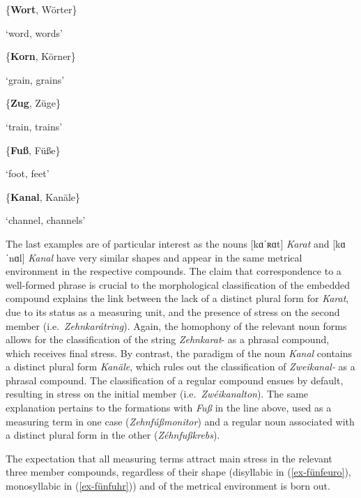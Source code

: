 \documentclass[output=paper
 ,nobabel
 ,draftmode
 ,colorlinks, citecolor=brown
]{langscibook}
\begin{document}
\ex \{\textbf{Wort}, Wörter\} 

`word, words' 

\ex \{\textbf{Korn}, Körner\} 

`grain, grains' 

\ex \{\textbf{Zug}, Züge\} 

`train, trains'	

\ex \{\textbf{Fuß}, Füße\} 

`foot, feet' 

\ex \{\textbf{Kanal}, Kanäle\} 

`channel, channels' 
\z
\z

\noindent
The last examples are of particular interest as the nouns [kɑˈʀɑt] \emph{Karat} and [kɑˈnɑl]
\emph{Kanal} have very similar shapes and appear in the same metrical environment in the respective
compounds. The claim that correspondence to a well-formed phrase is crucial to the morphological
classification of the embedded compound explains the link between the lack of a distinct plural form
for \emph{Karat}, due to its status as a measuring unit, and the presence of stress on the second
member (i.e.\ \emph{Zehnkarátring}). Again, the homophony of the relevant noun forms allows for the
classification of the string \emph{Zehnkarat}{}- as a phrasal compound, which receives final stress. By contrast, the paradigm of the noun \emph{Kanal} contains a distinct plural form \emph{Kanäle}, which rules out the classification of \emph{Zweikanal-} as a phrasal compound. The classification of a regular compound ensues by default, resulting in stress on the initial member (i.e.\ \emph{Zwéikanalton}).
The same explanation pertains to the formations with \emph{Fuß} in the line above, used as a measuring term in one case (\emph{Zehnfúßmonitor}) and a regular noun associated with a distinct plural form in the other (\emph{Zéhnfußkrebs}). 

The expectation that all measuring terms attract main stress in the relevant three member compounds, regardless of their shape (disyllabic in (\ref{ex-fünfeuro}), monosyllabic in (\ref{ex-fünfuhr})) and of the metrical environment is born out.
\end{document}
